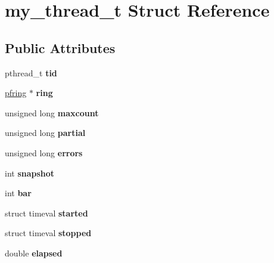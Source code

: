 \hypertarget{structmy__thread__t}{
\section{my\_\-thread\_\-t Struct Reference}
\label{structmy__thread__t}
}
\subsection*{Public Attributes}
\begin{DoxyCompactItemize}
\item 
\hypertarget{structmy__thread__t_a8eafcebc86c1b0ee83974222fd471922}{
pthread\_\-t {\bfseries tid}}
\label{structmy__thread__t_a8eafcebc86c1b0ee83974222fd471922}

\item 
\hypertarget{structmy__thread__t_a049ec9580e30fb8edccaced0f6088107}{
\hyperlink{struct____pfring}{pfring} $\ast$ {\bfseries ring}}
\label{structmy__thread__t_a049ec9580e30fb8edccaced0f6088107}

\item 
\hypertarget{structmy__thread__t_a84b1ad4b41a544e227d036323af92582}{
unsigned long {\bfseries maxcount}}
\label{structmy__thread__t_a84b1ad4b41a544e227d036323af92582}

\item 
\hypertarget{structmy__thread__t_afb953cbf14c25ff19c8788e8bf350976}{
unsigned long {\bfseries partial}}
\label{structmy__thread__t_afb953cbf14c25ff19c8788e8bf350976}

\item 
\hypertarget{structmy__thread__t_a51140c0b8324964e2d7369999a731800}{
unsigned long {\bfseries errors}}
\label{structmy__thread__t_a51140c0b8324964e2d7369999a731800}

\item 
\hypertarget{structmy__thread__t_a2304cdae4b6a8137a5e93a43d9875514}{
int {\bfseries snapshot}}
\label{structmy__thread__t_a2304cdae4b6a8137a5e93a43d9875514}

\item 
\hypertarget{structmy__thread__t_a08bb00c6fcf189705478c6944367834a}{
int {\bfseries bar}}
\label{structmy__thread__t_a08bb00c6fcf189705478c6944367834a}

\item 
\hypertarget{structmy__thread__t_a058dd6ce9c46cf41ef367ad29170a07c}{
struct timeval {\bfseries started}}
\label{structmy__thread__t_a058dd6ce9c46cf41ef367ad29170a07c}

\item 
\hypertarget{structmy__thread__t_afac834685dc98d79153d6459f2c7d7e9}{
struct timeval {\bfseries stopped}}
\label{structmy__thread__t_afac834685dc98d79153d6459f2c7d7e9}

\item 
\hypertarget{structmy__thread__t_a599b6da5cf66ea851baf8646a24a9377}{
double {\bfseries elapsed}}
\label{structmy__thread__t_a599b6da5cf66ea851baf8646a24a9377}

\end{DoxyCompactItemize}


